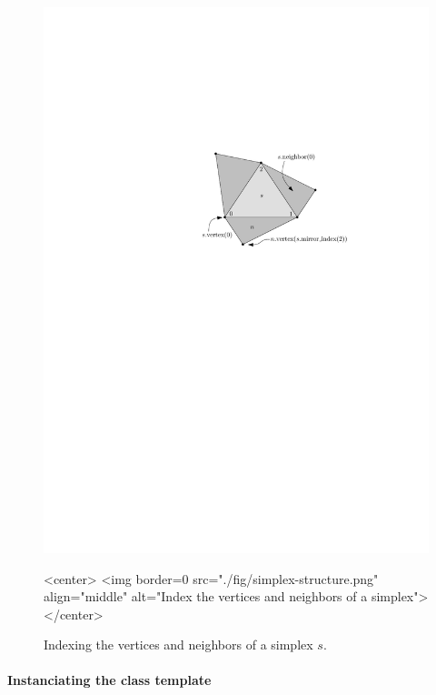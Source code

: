 {{\begin{figure}[htbp]
\begin{ccTexOnly}
\begin{center}
\includegraphics{Triangulation/fig/simplex-structure.pdf}
\end{center}
\end{ccTexOnly}
\begin{ccHtmlOnly}
<center>
<img border=0 src="./fig/simplex-structure.png" align="middle" alt="Index the vertices and neighbors of a simplex">
</center>
\end{ccHtmlOnly}
\caption{Indexing the vertices and neighbors of a simplex $s$.}
\label{triangulation:fig:simplex}
\end{figure} 

\paragraph{Instanciating the class template}

}}
